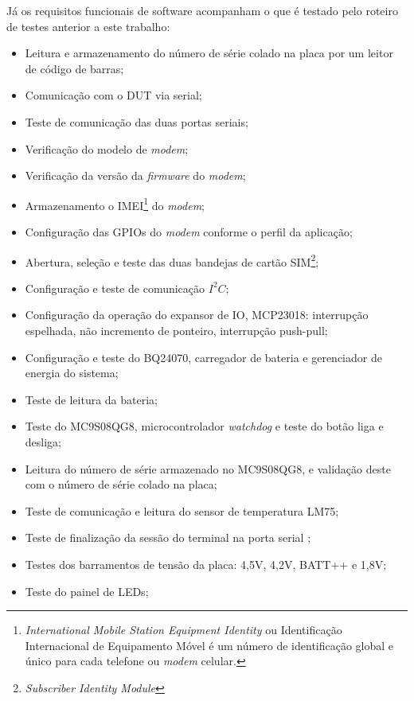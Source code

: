         Já os requisitos funcionais de software acompanham o que é testado pelo roteiro de testes anterior a este trabalho:
        \begin{itemize}
            \item Leitura e armazenamento do número de série colado na placa por um leitor de código de barras;
            \item Comunicação com o DUT via serial;
            \item Teste de comunicação das duas portas seriais;
            \item Verificação do modelo de \textit{modem};
            \item Verificação da versão da \textit{firmware} do \textit{modem};
            \item Armazenamento o IMEI\footnote{\textit{International Mobile Station Equipment Identity} ou Identificação Internacional de Equipamento Móvel é um número de identificação global e único para cada telefone ou \textit{modem} celular.} do \textit{modem};
            \item Configuração das GPIOs do \textit{modem} conforme o perfil da aplicação;
            \item Abertura, seleção e teste das duas bandejas de cartão SIM\footnote{\textit{Subscriber Identity Module}};
            \item Configuração e teste de comunicação $I^{2}C$;
            \item Configuração da operação do expansor de IO, MCP23018: interrupção espelhada, não incremento de ponteiro, interrupção push-pull;
            \item Configuração e teste do BQ24070, carregador de bateria e gerenciador de energia do sistema;
            \item Teste de leitura da bateria;
            \item Teste do MC9S08QG8, microcontrolador \textit{watchdog} e teste do botão liga e desliga;
            \item Leitura do número de série armazenado no MC9S08QG8, e validação deste com o número de série colado na placa;
            \item Teste de comunicação e leitura do sensor de temperatura LM75;
            \item Teste de finalização da sessão do terminal na porta serial ;
            \item Testes dos barramentos de tensão da placa: 4,5V, 4,2V, BATT++ e 1,8V;
            \item Teste do painel de LEDs;

\end{itemize}
